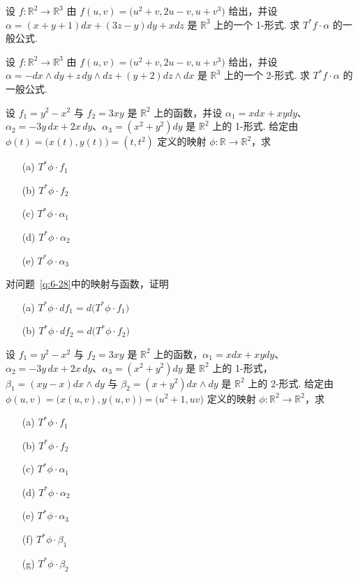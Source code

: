 \begin{question}\label{q:6-26}
设 $f:\mathbb{R}^2\to\mathbb{R}^3$ 由 $f(u,v)=\bigl(u^2+v,2u-v,u+v^3\bigr)$ 给出，并设 $\alpha=(x+y+1)dx+(3z-y)dy+xdz$ 是 $\mathbb{R}^3$ 上的一个 1-形式. 求 $T^*f\cdot\alpha$ 的一般公式.
\end{question}

\begin{question}\label{q:6-27}
设 $f:\mathbb{R}^2\to\mathbb{R}^3$ 由 $f(u,v)=\bigl(u^2+v,2u-v,u+v^3\bigr)$ 给出，并设 $\alpha=-dx\wedge dy+z\,dy\wedge dz+(y+2)dz\wedge dx$ 是 $\mathbb{R}^3$ 上的一个 2-形式. 求 $T^*f\cdot\alpha$ 的一般公式.
\end{question}

\begin{question}\label{q:6-28}
设 $f_1=y^2-x^2$ 与 $f_2=3xy$ 是 $\mathbb{R}^2$ 上的函数，并设 $\alpha_1=xdx+xydy$、$\alpha_2=-3y\,dx+2x\,dy$、$\alpha_3=(x^2+y^2)dy$ 是 $\mathbb{R}^2$ 上的 1-形式. 给定由 $\phi(t)=\bigl(x(t),y(t)\bigr)=(t,t^2)$ 定义的映射 $\phi:\mathbb{R}\to\mathbb{R}^2$，求
\begin{enumerate}
  \item[(a)] $T^*\phi\cdot f_1$
  \item[(b)] $T^*\phi\cdot f_2$
  \item[(c)] $T^*\phi\cdot\alpha_1$
  \item[(d)] $T^*\phi\cdot\alpha_2$
  \item[(e)] $T^*\phi\cdot\alpha_3$
\end{enumerate}
\end{question}

\begin{question}\label{q:6-29}
对问题~\ref{q:6-28}中的映射与函数，证明
\begin{enumerate}
  \item[(a)] $T^*\phi\cdot df_1=d\bigl(T^*\phi\cdot f_1\bigr)$
  \item[(b)] $T^*\phi\cdot df_2=d\bigl(T^*\phi\cdot f_2\bigr)$
\end{enumerate}
\end{question}

\begin{question}\label{q:6-30}
设 $f_1=y^2-x^2$ 与 $f_2=3xy$ 是 $\mathbb{R}^2$ 上的函数，$\alpha_1=xdx+xydy$、$\alpha_2=-3y\,dx+2x\,dy$、$\alpha_3=(x^2+y^2)dy$ 是 $\mathbb{R}^2$ 上的 1-形式，$\beta_1=(xy-x)dx\wedge dy$ 与 $\beta_2=(x+y^2)dx\wedge dy$ 是 $\mathbb{R}^2$ 上的 2-形式. 给定由 $\phi(u,v)=\bigl(x(u,v),y(u,v)\bigr)=\bigl(u^2+1,uv\bigr)$ 定义的映射 $\phi:\mathbb{R}^2\to\mathbb{R}^2$，求
\begin{enumerate}
  \item[(a)] $T^*\phi\cdot f_1$
  \item[(b)] $T^*\phi\cdot f_2$
  \item[(c)] $T^*\phi\cdot\alpha_1$
  \item[(d)] $T^*\phi\cdot\alpha_2$
  \item[(e)] $T^*\phi\cdot\alpha_3$
  \item[(f)] $T^*\phi\cdot\beta_1$
  \item[(g)] $T^*\phi\cdot\beta_2$
\end{enumerate}
\end{question}

